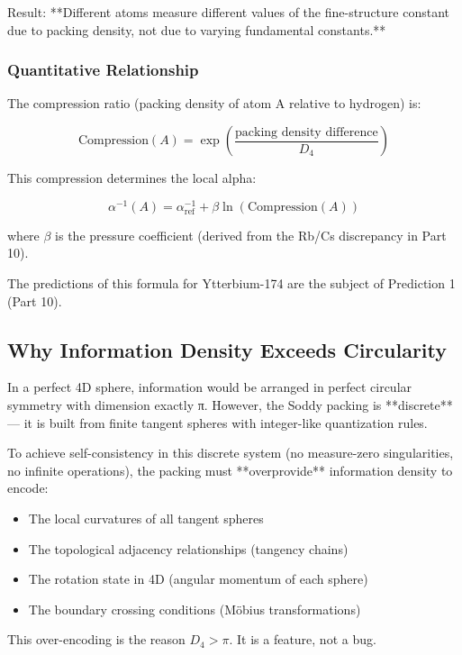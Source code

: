 \documentclass[11pt,a4paper]{article}
\begin{document}
      Result: **Different atoms measure different values of the fine-structure constant due to packing density, not due to varying fundamental constants.**

    \subsubsection{Quantitative Relationship}

      The compression ratio (packing density of atom A relative to hydrogen) is:

      \[
      \text{Compression}(A) = \exp\left(\frac{\text{packing density difference}}{D_4}\right)
      \]

      This compression determines the local alpha:

      \[
      \alpha^{-1}(A) = \alpha^{-1}_{\text{ref}} + \beta \ln(\text{Compression}(A))
      \]

      where $\beta$ is the pressure coefficient (derived from the Rb/Cs discrepancy in Part 10).

      The predictions of this formula for Ytterbium-174 are the subject of Prediction 1 (Part 10).

  \subsection{Why Information Density Exceeds Circularity}

    In a perfect 4D sphere, information would be arranged in perfect circular symmetry with dimension exactly π. However, the Soddy packing is **discrete** — it is built from finite tangent spheres with integer-like quantization rules.

    To achieve self-consistency in this discrete system (no measure-zero singularities, no infinite operations), the packing must **overprovide** information density to encode:

    \begin{itemize}
    \item The local curvatures of all tangent spheres
    \item The topological adjacency relationships (tangency chains)
    \item The rotation state in 4D (angular momentum of each sphere)
    \item The boundary crossing conditions (Möbius transformations)
    \end{itemize}

    This over-encoding is the reason $D_4 > \pi$. It is a feature, not a bug.
\end{document}

